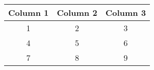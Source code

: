 \documentclass{article}
\begin{document}
\begin{center}
\begin{tabular}{|| c c c ||}
\hline
Column 1 & Column 2 & Column 3\\
\hline\hline
1 & 2 & 3 \\
\hline
4 & 5 & 6 \\
\hline
7 & 8 & 9 \\
\hline
\end{tabular}
\end{center}
\end{document}
